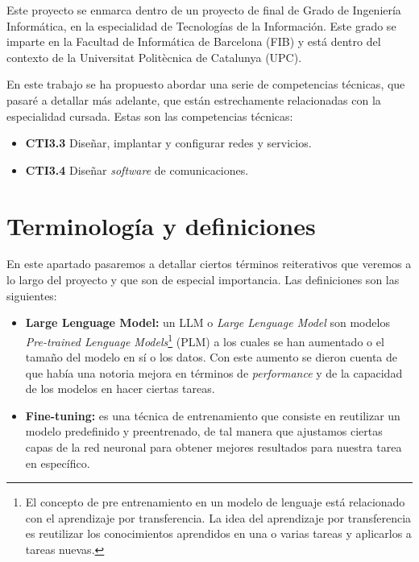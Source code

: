 
Este proyecto se enmarca dentro de un proyecto de final de Grado de Ingeniería
Informática, en la especialidad de Tecnologías de la Información. Este grado se
imparte en la Facultad de Informática de Barcelona (FIB) y está dentro del contexto
de la Universitat Politècnica de Catalunya (UPC).

En este trabajo se ha propuesto abordar una serie de competencias técnicas, que
pasaré a detallar más adelante, que están estrechamente relacionadas con la
especialidad cursada. Estas son las competencias técnicas:

\begin{itemize}
    \item \textbf{CTI3.3} Diseñar, implantar y configurar redes y servicios.
    \item \textbf{CTI3.4} Diseñar \textit{software} de comunicaciones.
\end{itemize}

\section{Terminología y definiciones}
\label{sec:terminalogia}


En este apartado pasaremos a detallar ciertos términos reiterativos que veremos a lo largo del proyecto y que son de especial importancia. Las definiciones son las siguientes:

\begin{itemize}
    \item \textbf{Large Lenguage Model:} un LLM o \textit{Large Lenguage Model} son modelos \textit{Pre-trained Lenguage Models}\footnote{El concepto de pre entrenamiento en un modelo
                                        de lenguaje está relacionado con el aprendizaje por transferencia. La idea del aprendizaje por transferencia es reutilizar los conocimientos
                                        aprendidos en una o varias tareas y aplicarlos a tareas nuevas.} (PLM) a los cuales se han aumentado o el tamaño del modelo en sí o los datos.
                                        Con este aumento se dieron cuenta de que había una notoria mejora en términos de \textit{performance} y de la capacidad de los modelos en hacer
                                        ciertas tareas. \cite{ZhaoWayneXin2023ASoL}
    \item \textbf{Fine-tuning:} es una técnica de entrenamiento que consiste en reutilizar un modelo predefinido y preentrenado, de tal manera que ajustamos ciertas capas de la
                                red neuronal para obtener mejores resultados para nuestra tarea en específico.
\end{itemize}

